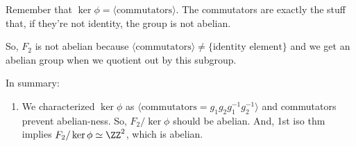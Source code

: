 \begin{exmp}
	Remember that $\ker\phi = \langle \text{commutators} \rangle$. The commutators are exactly the stuff that, if they're not identity, the group is not abelian.

	So, $F_2$ is not abelian because $ \langle \text{commutators} \rangle \neq \{\text{identity element}\}$ and we get an abelian group when we quotient out by this subgroup. 

	\vspace{1em}

	In summary:
	\begin{enumerate}[label = --]
		\item We characterized $\ker\phi$ as  $ \langle \text{commutators} = g_1g_2g_1^{-1}g_2^{-1} \rangle$ and commutators prevent abelian-ness. So, $F_2/\ker\phi$ should be abelian. And, 1st iso thm implies $F_2/\ker\phi \simeq \ZZ^2$, which is abelian.
	\end{enumerate}
\end{exmp}
